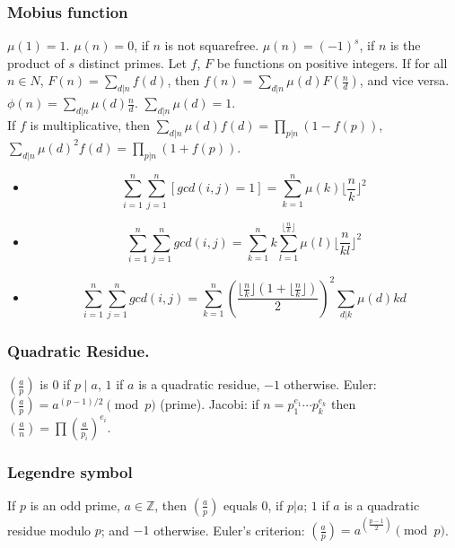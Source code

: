 \begin{small}
\subsubsection{Mobius function}
$\mu(1) = 1$. $\mu(n) = 0$, if $n$ is not squarefree.
$\mu(n) = (-1)^s$, if $n$ is the product of $s$ distinct primes.
Let $f$, $F$ be functions on positive integers.
If for all $n \in N$, $F(n)=\sum_{d|n} f(d)$, then $f(n) = \sum_{d|n} \mu(d) F(\frac{n}{d})$,
and vice versa. \quad
$\phi(n) = \sum_{d|n} \mu(d) \frac{n}{d}$.
\quad $\sum_{d|n} \mu(d) = 1$. \\
If $f$ is multiplicative, then $\sum_{d|n} \mu(d) f(d) = \prod_{p|n}(1-f(p))$,
$\sum_{d|n} \mu(d)^2 f(d) = \prod_{p|n} (1+f(p))$.
\begin{itemize}[noitemsep]
  \item \[ \sum_{i = 1}^n \sum_{j = 1}^n [gcd(i, j) = 1] = \sum_{k = 1}^n \mu(k) \lfloor \frac{n}{k} \rfloor^2 \]
  \item \[ \sum_{i = 1}^n \sum_{j = 1}^n gcd(i, j) = \sum_{k = 1}^n k \sum_{l = 1}^{\lfloor \frac{n}{k} \rfloor} \mu(l) \lfloor {\frac{n}{kl}} \rfloor^2 \]
  \item \[ \sum_{i = 1}^n \sum_{j = 1}^n gcd(i, j) = \sum_{k = 1}^n (\frac{\lfloor \frac{n}{k} \rfloor (1 + \lfloor \frac{n}{k} \rfloor) }{2})^2 \sum_{d | k} \mu (d) kd \]
\end{itemize}

\subsubsection{Quadratic Residue.} $(\frac{a}{p})$ is $0$ if $p\mid a$, $1$ if $a$ is a quadratic residue, $-1$ otherwise. Euler: $(\frac{a}{p})=a^{(p-1)/2}\pmod p$ (prime). Jacobi: if $n=p_1^{e_1}\cdots p_k^{e_k}$ then $(\frac{a}{n})=\prod (\frac{a}{p_i})^{e_i}$. 

\subsubsection{Legendre symbol} If $p$ is an odd prime, $a \in {\mathbb Z}$, then
$\left(\frac{a}{p}\right)$ equals $0$, if $p | a$; $1$ if $a$ is a quadratic
residue modulo $p$; and $-1$ otherwise.
Euler's criterion:
$\left(\frac{a}{p}\right)=a^{\left(\frac{p-1}{2}\right)} \pmod p$. \\

\end{small}
